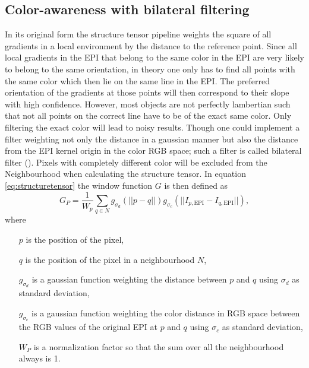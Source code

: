 \documentclass  [
  paper    = a4,
  BCOR     = 10mm,
  twoside,
  fontsize = 12pt,
  fleqn,
  toc      = bibnumbered,
  toc      = listofnumbered,
  numbers  = noendperiod,
  headings = normal,
  listof   = leveldown,
  version  = 3.03
]                                       {scrreprt}
\begin{document}
 \subsection{Color-awareness with bilateral filtering}
 \label{sec:bilateral}
 In its original form the structure tensor pipeline weights the square of all gradients in a local environment by the distance to the reference point. Since all local gradients in the EPI that belong to the same color in the EPI are very likely to belong to the same orientation, in theory one only has to find all points with the same color which then lie on the same line in the EPI. The preferred orientation of the gradients at those points will then correspond to their slope with high confidence. However, most objects are not perfectly lambertian such that not all points on the correct line have to be of the exact same color. Only filtering the exact color will lead to noisy results. Though one could implement a filter weighting not only the distance in a gaussian manner but also the distance from the  EPI kernel origin in the color RGB space; such a filter is called \glqq bilateral filter \grqq (\cite{tomasi1998bilateral}). Pixels with completely different color will be excluded from the Neighbourhood when calculating the structure tensor. In equation \ref{eq:structuretensor} the window function $G$ is then defined as 
 \begin{equation}\label{eq:bilateral}
 G_P = \frac{1}{W_p}\sum_{q\in N} g_{\sigma_d}(||p-q||) g_{\sigma_c}(||I_{p, \text{EPI}}-I_{q, \text{EPI}}||),
 \end{equation}
 where
 \begin{itemize}
 	\item[$p$] is the position of the pixel,
 	\item[$q$] is the position of the pixel in a neighbourhood $N$,
 	\item[ $g_{\sigma_d}$] is a gaussian function weighting the distance between $p$ and $q$ using $\sigma_d$ as standard deviation,
 	\item[ $g_{\sigma_c}$] is a gaussian function weighting the color distance in RGB space between the  RGB values of the original EPI at $p$ and $q$ using $\sigma_c$ as standard deviation,
 	\item[$W_P$] is a normalization factor so that the sum over all the neighbourhood always is 1. 
 \end{itemize}
\end{document}
